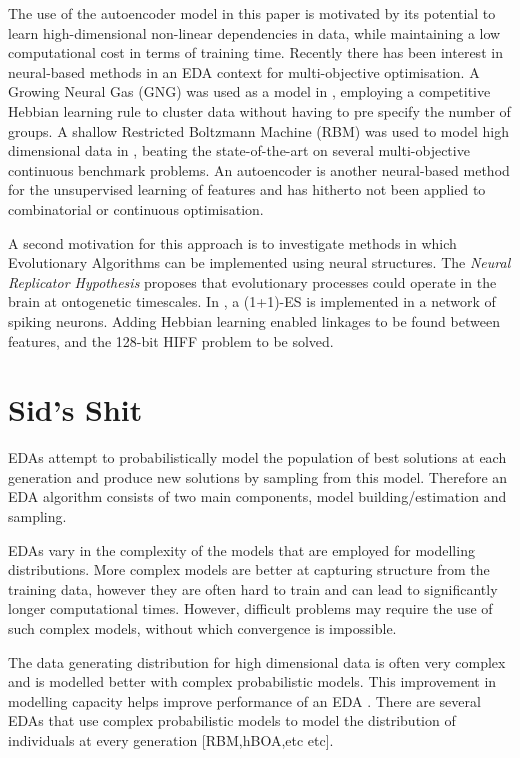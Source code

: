 \documentclass[runningheads,a4paper]{llncs}
\begin{document}
The use of the autoencoder model in this paper is motivated by its potential to learn high-dimensional non-linear dependencies in data, while maintaining a low computational cost in terms of training time. Recently there has been interest in neural-based methods in an EDA context for multi-objective optimisation. A Growing Neural Gas (GNG) was used as a model in \cite{moneda}, employing a competitive Hebbian learning rule to cluster data without having to pre specify the number of groups. A shallow Restricted Boltzmann Machine (RBM) was used to model high dimensional data in \cite{singapore}, beating the state-of-the-art on several multi-objective continuous benchmark problems. An autoencoder is another neural-based method for the unsupervised learning of features and has hitherto not been applied to combinatorial or continuous optimisation.

A second motivation for this approach is to investigate methods in which Evolutionary Algorithms can be implemented using neural structures. The {\em{Neural Replicator Hypothesis}} \cite{ref} proposes that evolutionary processes could operate in the brain at ontogenetic timescales. In \cite{fernando2010neuronal}, a (1+1)-ES is implemented in a network of spiking neurons. Adding Hebbian learning enabled linkages to be found between features, and the 128-bit HIFF problem to be solved.

\section{Sid's Shit}
EDAs attempt to probabilistically model the population of best solutions at each generation and produce new solutions by sampling from this model. Therefore an EDA algorithm consists of two main components, model building/estimation and sampling. 

EDAs vary in the complexity of the models that are employed for modelling distributions. More complex models are better at capturing structure from the training data, however they are often hard to train and can lead to significantly longer computational times. However, difficult problems may require the use of such complex models, without which convergence is impossible. 

The data generating distribution for high dimensional data is often very complex and is modelled better with complex probabilistic models. This improvement in modelling capacity helps improve performance of an EDA \cite{pelikan2002survey}. There are several EDAs that use complex probabilistic models to model the distribution of individuals at every generation [RBM,hBOA,etc etc]. 
\end{document}
